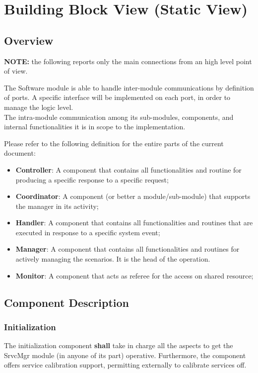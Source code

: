 \chapter{Building Block View (Static View)}
\label{chp:staticView}

\section{Overview}
\label{sec:overview}


\textbf{NOTE:} the following reports only the main connections from an high level point of view.

The Software module is able to handle inter-module communications by definition of ports. A specific interface will be implemented on each port,
in order to manage the logic level.\\
The intra-module communication among its sub-modules, components, and internal functionalities it is in scope to the implementation.

Please refer to the following definition for the entire parts of the current document:

\begin{itemize}
    \item \textbf{Controller}: A component that contains all functionalities and routine for producing a specific response to a specific request;
    \item \textbf{Coordinator}: A component (or better a module/sub-module) that supports the manager in its activity;
    \item \textbf{Handler}: A component that contains all functionalities and routines that are executed in response to a specific system event;
    \item \textbf{Manager}: A component that contains all functionalities and routines for actively managing the scenarios. It is the head of the operation.
    \item \textbf{Monitor}: A component that acts as referee for the access on shared resource; 
\end{itemize}

\section{Component Description}

\subsection{Initialization}
\label{subsec:Init}
The initialization component \textbf{shall} take in charge all the aspects to get the SrvcMgr module (in anyone of its part) operative. Furthermore, the component offers service calibration support, permitting externally to calibrate services off.

